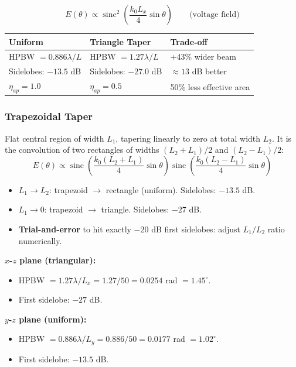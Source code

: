 \documentclass[10pt,letterpaper]{article}
\newcommand{\sinc}{\operatorname{sinc}}
\newcommand{\degrees}{^{\circ}}
\begin{document}
\begin{equation}
  E(\theta) \propto \sinc^2\!\left(\frac{k_0 L_x}{4}\sin\theta\right) \qquad \text{(voltage field)}
\end{equation}
\begin{center}
\begin{tabular}{lll}
\toprule
\textbf{Uniform} & \textbf{Triangle Taper} & \textbf{Trade-off} \\
\midrule
HPBW $= 0.886\lambda/L$ & HPBW $= 1.27\lambda/L$ & +43\% wider beam \\
Sidelobes: $-13.5$ dB & Sidelobes: $-27.0$ dB & $\approx 13$ dB better \\
$\eta_{ap} = 1.0$ & $\eta_{ap} = 0.5$ & 50\% less effective area \\
\bottomrule
\end{tabular}
\end{center}

\subsubsection{Trapezoidal Taper}
Flat central region of width $L_1$, tapering linearly to zero at total width $L_2$. It is the convolution of two rectangles of widths $(L_2+L_1)/2$ and $(L_2-L_1)/2$:
\begin{equation}
  E(\theta) \propto \sinc\!\left(\frac{k_0(L_2+L_1)}{4}\sin\theta\right)\sinc\!\left(\frac{k_0(L_2-L_1)}{4}\sin\theta\right)
\end{equation}
\begin{itemize}[noitemsep]
  \item $L_1 \to L_2$: trapezoid $\to$ rectangle (uniform). Sidelobes: $-13.5$ dB.
  \item $L_1 \to 0$: trapezoid $\to$ triangle. Sidelobes: $-27$ dB.
  \item \textbf{Trial-and-error} to hit exactly $-20$ dB first sidelobes: adjust $L_1/L_2$ ratio numerically.
\end{itemize}

\begin{tcolorbox}[examplebox, title={HW4 P3 Example: Rectangular Aperture with Triangle Taper in $x$, Uniform in $y$, $L_x=L_y=50\lambda$}]
\textbf{$x$-$z$ plane (triangular):}
\begin{itemize}[noitemsep]
  \item HPBW $= 1.27\lambda/L_x = 1.27/50 = 0.0254$ rad $= 1.45\degrees$.
  \item First sidelobe: $-27$ dB.
\end{itemize}
\textbf{$y$-$z$ plane (uniform):}
\begin{itemize}[noitemsep]
  \item HPBW $= 0.886\lambda/L_y = 0.886/50 = 0.0177$ rad $= 1.02\degrees$.
  \item First sidelobe: $-13.5$ dB.
\end{itemize}
\end{tcolorbox}
\end{document}
